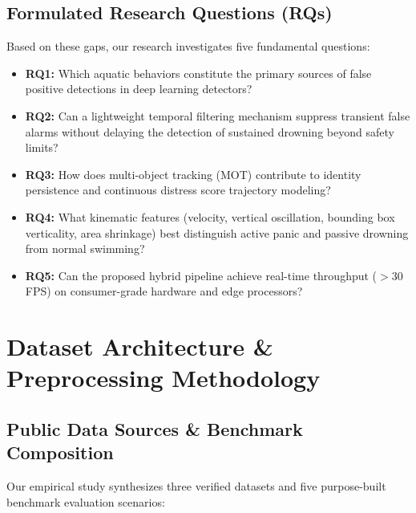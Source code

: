 \documentclass[a4paper,11pt]{article}
\begin{document}
\subsection{Formulated Research Questions (RQs)}
Based on these gaps, our research investigates five fundamental questions:
\begin{itemize}
    \item \textbf{RQ1:} Which aquatic behaviors constitute the primary sources of false positive detections in deep learning detectors?
    \item \textbf{RQ2:} Can a lightweight temporal filtering mechanism suppress transient false alarms without delaying the detection of sustained drowning beyond safety limits?
    \item \textbf{RQ3:} How does multi-object tracking (MOT) contribute to identity persistence and continuous distress score trajectory modeling?
    \item \textbf{RQ4:} What kinematic features (velocity, vertical oscillation, bounding box verticality, area shrinkage) best distinguish active panic and passive drowning from normal swimming?
    \item \textbf{RQ5:} Can the proposed hybrid pipeline achieve real-time throughput ($>30$ FPS) on consumer-grade hardware and edge processors?
\end{itemize}

\section{Dataset Architecture \& Preprocessing Methodology}

\subsection{Public Data Sources \& Benchmark Composition}
Our empirical study synthesizes three verified datasets and five purpose-built benchmark evaluation scenarios:
\end{document}
